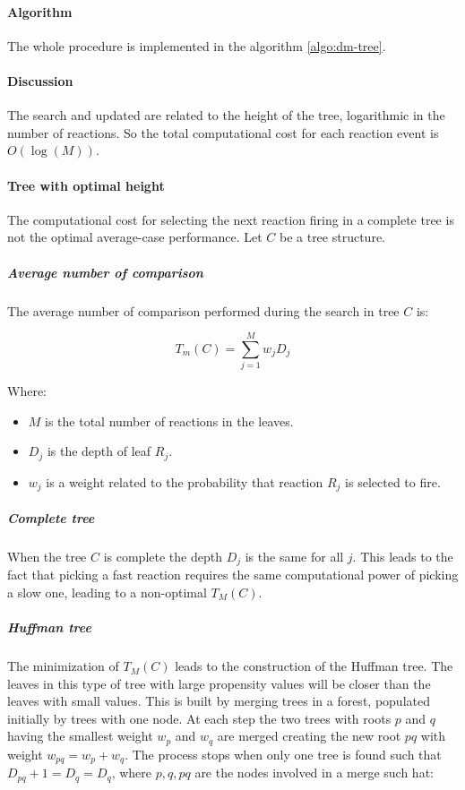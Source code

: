       \paragraph{Algorithm}
      The whole procedure is implemented in the algorithm \ref{algo:dm-tree}.

      

      \paragraph{Discussion}
      The search and updated are related to the height of the tree, logarithmic in the number of reactions.
      So the total computational cost for each reaction event is $O(\log(M))$.

      \paragraph{Tree with optimal height}
      The computational cost for selecting the next reaction firing in a complete tree is not the optimal average-case performance.
      Let $C$ be a tree structure.

        \subparagraph{Average number of comparison}
        The average number of comparison performed during the search in tree $C$ is:

        $$T_m(C) = \sum\limits_{j=1}^Mw_jD_j$$

        Where:

        \begin{multicols}{2}
          \begin{itemize}
            \item $M$ is the total number of reactions in the leaves.
            \item $D_j$ is the depth of leaf $R_j$.
            \item $w_j$ is a weight related to the probability that reaction $R_j$ is selected to fire.
          \end{itemize}
        \end{multicols}

        \subparagraph{Complete tree}
        When the tree $C$ is complete the depth $D_j$ is the same for all $j$.
        This leads to the fact that picking a fast reaction requires the same computational power of picking a slow one, leading to a non-optimal $T_M(C)$.

        \subparagraph{Huffman tree}
        The minimization of $T_M(C)$ leads to the construction of the Huffman tree.
        The leaves in this type of tree with large propensity values will be closer than the leaves with small values.
        This is built by merging trees in a forest, populated initially by trees with one node.
        At each step the two trees with roots $p$ and $q$ having the smallest weight $w_p$ and $w_q$ are merged creating the new root $pq$ with weight $w_{pq} = w_p+w_q$.
        The process stops when only one tree is found such that $D_{pq} +1 = D_q=D_q$, where $p, q, pq$ are the nodes involved in a merge such hat:

